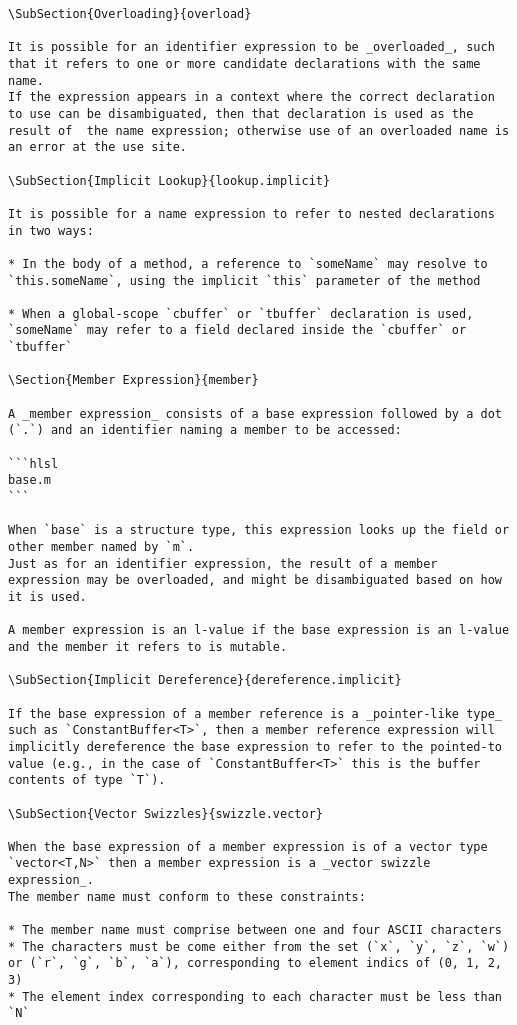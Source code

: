 \begin{verbatim}
\SubSection{Overloading}{overload}

It is possible for an identifier expression to be _overloaded_, such that it refers to one or more candidate declarations with the same name.
If the expression appears in a context where the correct declaration to use can be disambiguated, then that declaration is used as the result of  the name expression; otherwise use of an overloaded name is an error at the use site.

\SubSection{Implicit Lookup}{lookup.implicit}

It is possible for a name expression to refer to nested declarations in two ways:

* In the body of a method, a reference to `someName` may resolve to `this.someName`, using the implicit `this` parameter of the method

* When a global-scope `cbuffer` or `tbuffer` declaration is used, `someName` may refer to a field declared inside the `cbuffer` or `tbuffer`

\Section{Member Expression}{member}

A _member expression_ consists of a base expression followed by a dot (`.`) and an identifier naming a member to be accessed:

```hlsl
base.m
```

When `base` is a structure type, this expression looks up the field or other member named by `m`.
Just as for an identifier expression, the result of a member expression may be overloaded, and might be disambiguated based on how it is used.

A member expression is an l-value if the base expression is an l-value and the member it refers to is mutable.

\SubSection{Implicit Dereference}{dereference.implicit}

If the base expression of a member reference is a _pointer-like type_ such as `ConstantBuffer<T>`, then a member reference expression will implicitly dereference the base expression to refer to the pointed-to value (e.g., in the case of `ConstantBuffer<T>` this is the buffer contents of type `T`).

\SubSection{Vector Swizzles}{swizzle.vector}

When the base expression of a member expression is of a vector type `vector<T,N>` then a member expression is a _vector swizzle expression_.
The member name must conform to these constraints:

* The member name must comprise between one and four ASCII characters
* The characters must be come either from the set (`x`, `y`, `z`, `w`) or (`r`, `g`, `b`, `a`), corresponding to element indics of (0, 1, 2, 3)
* The element index corresponding to each character must be less than `N`


\end{verbatim}
